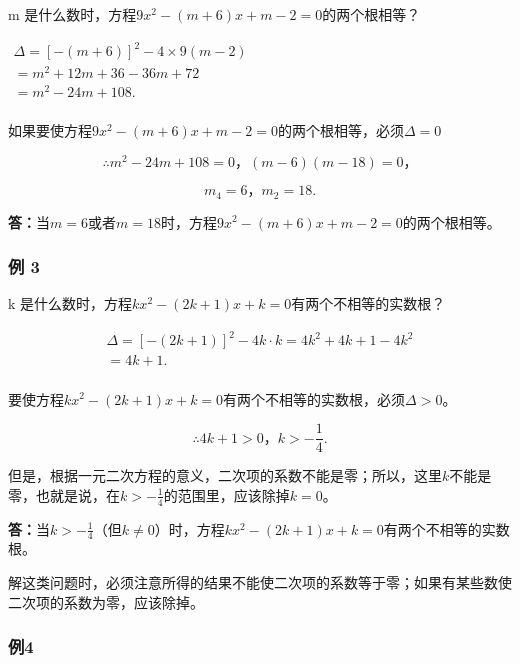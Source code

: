 m 是什么数时，方程\(9x^{2}-(m+6)x+m-2=0\)的两个根相等？

\(\begin{array}{l} \Delta = [-(m + 6)]^2 - 4 \times 9(m - 2) \\ = m^2 + 12m + 36 - 36m + 72 \\ = m^2 - 24m + 108. \\ \end{array}\)

如果要使方程\(9x^{2} - (m + 6)x + m - 2 = 0\)的两个根相等，必须\(\Delta = 0\)

\[
\therefore m ^ {2} - 24 m + 108 = 0\text{，} (m - 6) (m - 18) = 0\text{，}
\]

\[
m _ {4} = 6\text{，} m _ {2} = 18.
\]

\textbf{答：}当\(m = 6\)或者\(m = 18\)时，方程\(9x^{2} - (m + 6)x + m - 2 = 0\)的两个根相等。

\subsubsection{例 3}

k 是什么数时，方程\(kx^{2}-(2k+1)x+k=0\)有两个不相等的实数根？


\[
\begin{array}{l} \Delta = [ - (2 k + 1) ] ^ {2} - 4 k \cdot k = 4 k ^ {2} + 4 k + 1 - 4 k ^ {2} \\ = 4 k + 1. \\ \end{array}
\]

要使方程\(kx^{2} - (2k + 1)x + k = 0\)有两个不相等的实数根，必须\(\Delta > 0\)。

\[
\therefore 4 k + 1 > 0\text{，} k > - \frac{1}{4}.
\]

但是，根据一元二次方程的意义，二次项的系数不能是零；所以，这里\(k\)不能是零，也就是说，在\(k > -\frac{1}{4}\)的范围里，应该除掉\(k = 0\)。

\textbf{答：}当\(k > -\frac{1}{4}\)（但\(k \neq 0\)）时，方程\(kx^2 - (2k + 1)x + k = 0\)有两个不相等的实数根。

解这类问题时，必须注意所得的结果不能使二次项的系数等于零；如果有某些数使二次项的系数为零，应该除掉。

\subsubsection{例4}

